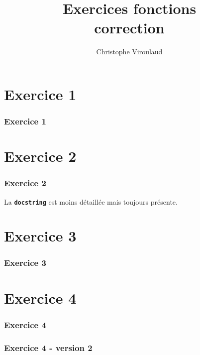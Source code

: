 \documentclass[svgnames,11pt]{beamer}
\author[]{Christophe Viroulaud}
\title{Exercices fonctions\\ correction}
\date{\framebox{\textbf{Lang 06}}}
\institute{Première - NSI}
\begin{document}
\begin{frame}
\titlepage
\end{frame}
\section{Exercice 1}
\begin{frame}
    \frametitle{Exercice 1}

    

\end{frame}
\section{Exercice 2}
\begin{frame}
    \frametitle{Exercice 2}

    
\begin{aretenir}[Remarque]
La \textbf{\texttt{docstring}} est moins détaillée mais toujours présente.
\end{aretenir}
\end{frame}
\section{Exercice 3}
\begin{frame}
    \frametitle{Exercice 3}
      
   
\end{frame}
\section{Exercice 4}
\begin{frame}
    \frametitle{Exercice 4}

    

\end{frame}
\begin{frame}
    \frametitle{Exercice 4 - version 2}

    

\end{frame}
\end{document}
